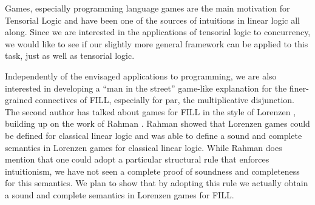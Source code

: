 \documentclass{elsarticle}
\begin{document}
Games, especially programming language games are the main motivation
for Tensorial Logic and have been one of the sources of intuitions in
linear logic all along. Since we are interested in the applications of
tensorial logic to concurrency, we would like to see if our slightly
more general framework can be applied to this task, just as well as
tensorial logic.

Independently of the envisaged applications to programming, we are
also interested in developing a ``man in the street'' game-like
explanation for the finer-grained connectives of FILL, especially for
par, the multiplicative disjunction. The second author has talked
about games for FILL in the style of Lorenzen \cite{dePaiva:2011},
building up on the work of Rahman
\cite{Keiff:2011,Rahman:2005}. Rahman showed that Lorenzen games could
be defined for classical linear logic \cite{Rahman:2002} and was able
to define a sound and complete semantics in Lorenzen games for
classical linear logic. While Rahman does mention that one could adopt
a particular structural rule that enforces intuitionism, we have not
seen a complete proof of soundness and completeness for this
semantics.  We plan to show that by adopting this rule we actually
obtain a sound and complete semantics in Lorenzen games for FILL.

\end{document}
